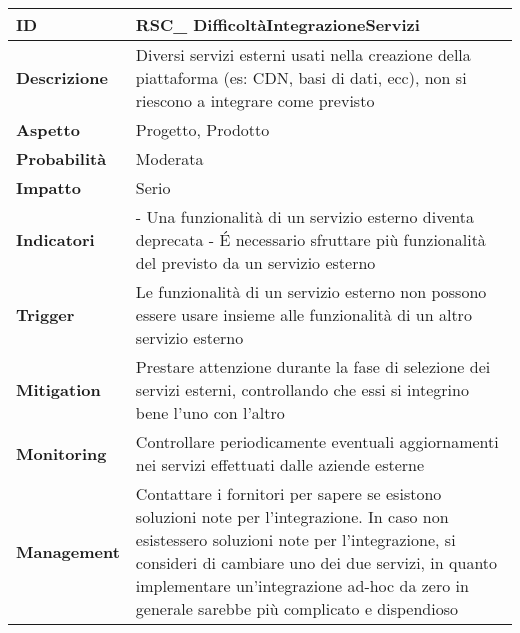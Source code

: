 \begin{tabular}{|p{2.2cm}|p{9.6cm}| } 
 	\hline
	 \textbf{ID} & RSC\_ DifficoltàIntegrazioneServizi\\ [0.5ex] 
	\hline
	\textbf{Descrizione} & Diversi servizi esterni usati nella creazione della piattaforma (es: CDN, basi di dati, ecc), non si riescono a integrare come previsto\\ 
	\hline
	\textbf{Aspetto} &  Progetto, Prodotto\\ 
	\hline
	\textbf{Probabilità} &  Moderata\\ 
	\hline
	\textbf{Impatto} &  Serio\\ 
	\hline
	\textbf{Indicatori} & - Una funzionalità di un servizio esterno diventa deprecata\newline
				  - \'E necessario sfruttare più funzionalità del previsto da un servizio esterno \\
	\hline
	\textbf{Trigger} & Le funzionalità di un servizio esterno non possono essere usare insieme alle funzionalità di un altro servizio esterno\\
	\hline
	\textbf{Mitigation} & Prestare attenzione durante la fase di selezione dei servizi esterni, controllando che essi si integrino bene l'uno con l'altro\\ 
	\hline
	\textbf{Monitoring} & Controllare periodicamente eventuali aggiornamenti nei servizi effettuati dalle aziende esterne\\ 
	\hline
	\textbf{Management} & Contattare i fornitori per sapere se esistono soluzioni note per l'integrazione. In caso non esistessero soluzioni note per l'integrazione, si consideri di cambiare uno dei due servizi, in quanto implementare un'integrazione ad-hoc da zero in generale sarebbe più complicato e dispendioso\\ 
	\hline
\end{tabular}

